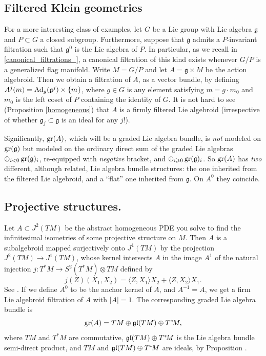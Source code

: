 \documentclass[leqno,12pt]{amsart} %
\begin{document}
\subsection{ Filtered Klein geometries}\label{eg2}
For a more interesting class of examples, let $G$ be a Lie group with Lie algebra
${\mathfrak g}$ and $P \subset G$ a closed subgroup. Furthermore, suppose that
${\mathfrak g} $ admits a $P$-invariant filtration such that ${\mathfrak g}^0$ is the Lie
algebra of $P$. In particular, as we recall in \ref{canonical_filtrations_}, a canonical
filtration of this kind exists whenever $G/P$ is a generalized flag manifold.  Write
$M =G/P$ and let $A={\mathfrak g} \times M$ be the action algebroid. Then we obtain a
filtration of $A$, as a vector bundle, by defining
$A^j(m) = \operatorname{Ad}_g({\mathfrak g}^j)\times \{m\}$, where $g \in G$ is any element
satisfying $m = g \cdot m_0$ and $m_0$ is the left coset of $P $ containing the identity
of $G$. It is not hard to see (Proposition \ref{homogeneous}) that $A$ is a firmly
filtered Lie algebroid (irrespective of whether ${\mathfrak g}_j \subset {\mathfrak g} $
is an ideal for any $j$!).


Significantly, $\operatorname{\operatorname{gr}}(A)$, which will be a graded Lie algebra bundle, is {\em not}
modeled on $\operatorname{\operatorname{gr}}({\mathfrak g})$ but modeled on the ordinary direct sum of the graded
Lie algebras $\oplus_{i<0}\operatorname{\operatorname{gr}}({\mathfrak g})_i$, re-equipped with {\em negative}
bracket, and $\oplus_{i\geqslant 0}\operatorname{\operatorname{gr}}({\mathfrak g})_i$. So $\operatorname{\operatorname{gr}}(A)$ has {\em two}
different, although related, Lie algebra bundle structures: the one inherited from the
filtered Lie algebroid, and a ``flat'' one inherited from ${\mathfrak g} $. On $A^0$ they
coincide.

\subsection{ Projective structures.}\label{projective} Let $A \subset J^2(TM)$ be the
abstract homogeneous PDE you solve to find the infinitesimal isometries of some projective
structure on $M$. Then $A$ is a subalgebroid mapped surjectively onto $J^1(TM)$ by the
projection $J^2(TM) \rightarrow J^1(TM)$, whose kernel intersects $A$ in the image $A^1$
of the natural injection $j \colon T^*\!M \rightarrow S^2(T^*\!M)\otimes TM$ defined by
$$j(Z)(X_1, X_2) = \langle Z,X_1\rangle X_2 + \langle Z, X_2\rangle X_1.$$ See \cite[\S5.9]{Blaom_12}. If we define
$A^0$ to be the anchor kernel of $A$, and $A^{-1}=A$, we get a firm Lie algebroid
filtration of $A$ with $|A|=1$. The corresponding graded Lie algebra bundle is
$$\operatorname{\operatorname{gr}}(A) = TM \oplus \mathfrak{gl}(TM) \oplus T^*\!M,$$
where $TM$ and $T^*\!M $ are commutative, $\mathfrak{gl}(TM) \oplus T^*\!M $ is the Lie algebra
bundle semi-direct product, and $TM$ and $\mathfrak{gl}(TM) \oplus T^*\!M $ are ideals, by
Proposition .
\end{document}
